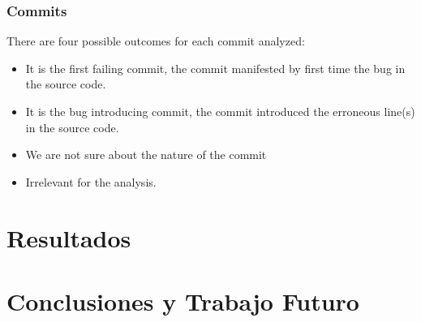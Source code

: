 \documentclass[a4paper, 12pt]{book}
\begin{document}
\subsubsection{Commits}

There are four possible outcomes for each commit analyzed:
\begin{itemize}
	\item It is the first failing commit, the commit manifested by first time the bug in the source code.
	\item It is the bug introducing commit, the commit introduced the erroneous line(s) in the source code.
	\item We are not sure about the nature of the commit
	\item Irrelevant for the analysis. %
\end{itemize}


\section{Resultados}
\section{Conclusiones y Trabajo Futuro}


\cleardoublepage


\end{document}
